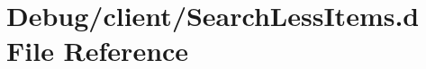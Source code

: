 \hypertarget{SearchLessItems_8d}{\section{Debug/client/\-Search\-Less\-Items.d File Reference}
\label{SearchLessItems_8d}
}
